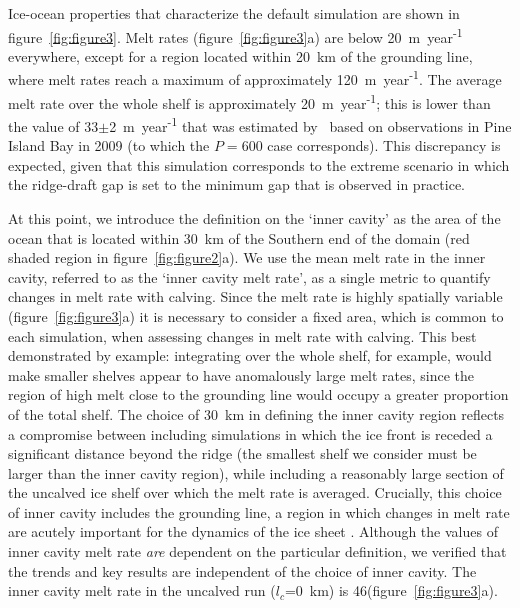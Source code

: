 \documentclass[draft]{agujournal2019}
\begin{document}
Ice-ocean properties that characterize the default simulation are shown in figure~\ref{fig:figure3}. Melt rates (figure~\ref{fig:figure3}a) are below  20~m~year\textsuperscript{-1} everywhere, except for a region located within 20~km of the grounding line, where melt rates reach a maximum of approximately 120~m~year\textsuperscript{-1}. The average melt rate over the whole shelf is approximately 20~m~year\textsuperscript{-1}; this is lower than the value of 33$\pm$2~m~year\textsuperscript{-1} that was estimated by~ based on observations in Pine Island Bay in 2009 (to which the $P=600$ case corresponds). This discrepancy is expected, given that this simulation corresponds to the extreme scenario in which the ridge-draft gap is set to the minimum gap that is observed in practice.

At this point, we introduce the definition on the `inner cavity' as the area of the ocean that is located within 30~km of the Southern end of the domain (red shaded region in figure~\ref{fig:figure2}a). We use the mean melt rate in the inner cavity, referred to as the `inner cavity melt rate', as a single metric to quantify changes in melt rate with calving. Since the melt rate is highly spatially variable (figure~\ref{fig:figure3}a) it is necessary to consider a fixed area, which is common to each simulation, when assessing changes in melt rate with calving. This best demonstrated by example: integrating over the whole shelf, for example, would make smaller shelves appear to have anomalously large melt rates, since the region of high melt close to the grounding line would occupy a greater proportion of the total shelf. %
The choice of 30~km in defining the inner cavity region reflects a compromise between including simulations in which the ice front is receded a significant distance beyond the ridge (the smallest shelf we consider must be larger than the inner cavity region), while including a reasonably large section of the uncalved ice shelf over which the melt rate is averaged. Crucially, this choice of inner cavity includes the grounding line, a region in which changes in melt rate are acutely important for the dynamics of the ice sheet \cite{Seroussi2014Cryo, Athern2017GRL}. Although the values of inner cavity melt rate \textit{are} dependent on the particular definition, we verified that the trends and key results are independent of the choice of inner cavity. The inner cavity melt rate in the uncalved run ($l_c$=0~km) is 46\mpryr (figure~\ref{fig:figure3}a).
\end{document}
